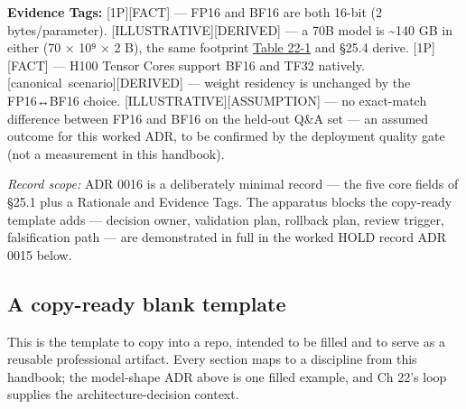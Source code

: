 \textbf{Evidence Tags:} \mbox{{[}1P{]}}\hspace{0pt}\mbox{{[}FACT{]}} --- FP16 and BF16 are both
16-bit (2 bytes/parameter). \mbox{{[}ILLUSTRATIVE{]}}\hspace{0pt}\mbox{{[}DERIVED{]}} --- a 70B
model is \textasciitilde140 GB in either (70 × 10⁹ × 2 B), the same
footprint \hyperref[tab:22.1]{Table 22-1} and §25.4 derive. \mbox{{[}1P{]}}\hspace{0pt}\mbox{{[}FACT{]}} --- H100
Tensor Cores support BF16 and TF32 natively. \mbox{{[}canonical
scenario{]}}\hspace{0pt}\mbox{{[}DERIVED{]}} --- weight residency is unchanged by the
FP16↔BF16 choice. \mbox{{[}ILLUSTRATIVE{]}}\hspace{0pt}\mbox{{[}ASSUMPTION{]}} --- no exact-match
difference between FP16 and BF16 on the held-out Q\&A set --- an assumed
outcome for this worked ADR, to be confirmed by the deployment quality
gate (not a measurement in this handbook).

\emph{Record scope:} ADR 0016 is a deliberately minimal record --- the
five core fields of §25.1 plus a Rationale and Evidence Tags. The
apparatus blocks the copy-ready template adds --- decision owner,
validation plan, rollback plan, review trigger, falsification path ---
are demonstrated in full in the worked HOLD record ADR 0015 below.

\subsection{A copy-ready blank
template}\label{a-copy-ready-blank-template}

This is the template to copy into a repo, intended to be filled and to
serve as a reusable professional artifact. Every section maps to a
discipline from this handbook; the model-shape ADR above is one filled
example, and Ch 22's loop supplies the architecture-decision context.

